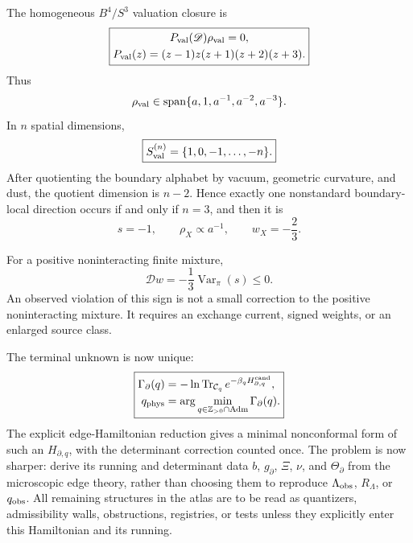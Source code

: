 \documentclass[aps,prd,reprint,nofootinbib,superscriptaddress,floatfix]{revtex4-2}
\numberwithin{equation}{section}
\theoremstyle{definition}
\theoremstyle{plain}
\newcommand{\Dil}{\mathscr D}
\newcommand{\spanop}{\operatorname{span}}
\begin{document}
The homogeneous \(B^4/S^3\) valuation closure is
\begin{equation}
\boxed{
\begin{gathered}
P_{\rm val}(\Dil)\rho_{\rm val}=0,\\
P_{\rm val}(z)=(z-1)z(z+1)(z+2)(z+3).
\end{gathered}}
\end{equation}
Thus
\begin{equation}
\rho_{\rm val}\in\spanop\{a,1,a^{-1},a^{-2},a^{-3}\}.
\end{equation}
In \(n\) spatial dimensions,
\begin{equation}
\boxed{
S_{\rm val}^{(n)}=\{1,0,-1,\ldots,-n\}.
}
\end{equation}
After quotienting the boundary alphabet by vacuum, geometric curvature, and dust, the quotient dimension is \(n-2\).  Hence exactly one nonstandard boundary-local direction occurs if and only if \(n=3\), and then it is
\begin{equation}
\boxed{
s=-1,\qquad \rho_X\propto a^{-1},\qquad w_X=-\frac23.
}
\end{equation}

For a positive noninteracting finite mixture,
\begin{equation}
\boxed{
\Dil w=-\frac13\operatorname{Var}_\pi(s)\le0.
}
\end{equation}
An observed violation of this sign is not a small correction to the positive noninteracting mixture.  It requires an exchange current, signed weights, or an enlarged source class.

The terminal unknown is now unique:
\begin{equation}
\boxed{
\begin{aligned}
\Gamma_\partial(q)
&=
-\ln\operatorname{Tr}_{\mathcal C_q}
e^{-\beta_qH_{\partial,q}^{\rm cand}},\\
q_{\rm phys}
&=\arg\min_{q\in\mathbb Z_{>0}\cap{\rm Adm}}\Gamma_\partial(q).
\end{aligned}
}
\end{equation}
The explicit edge-Hamiltonian reduction gives a minimal nonconformal form of such an \(H_{\partial,q}\), with the determinant correction counted once.  The problem is now sharper: derive its running and determinant data \(b\), \(g_\partial\), \(\Xi\), \(\nu\), and \(\Theta_\partial\) from the microscopic edge theory, rather than choosing them to reproduce \(\Lambda_{\rm obs}\), \(R_\Lambda\), or \(q_{\rm obs}\).  All remaining structures in the atlas are to be read as quantizers, admissibility walls, obstructions, registries, or tests unless they explicitly enter this Hamiltonian and its running.
\end{document}
